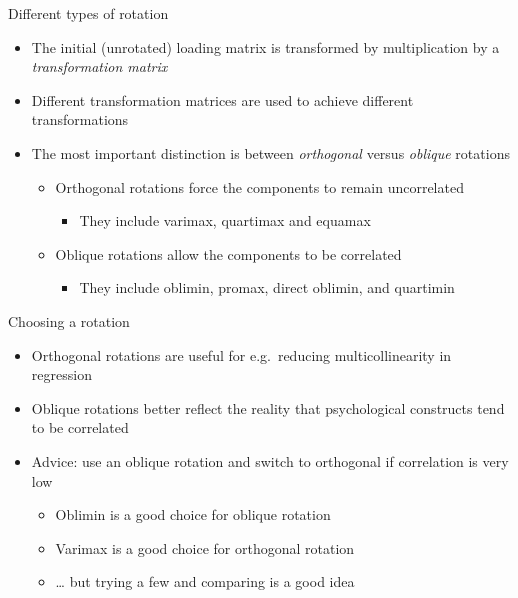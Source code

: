 \documentclass[
  ignorenonframetext,
]{beamer}
\providecommand{\tightlist}{%
  \setlength{\itemsep}{0pt}\setlength{\parskip}{0pt}}
\begin{document}
\begin{frame}{Different types of rotation}
\protect\hypertarget{different-types-of-rotation}{}

\begin{itemize}
\tightlist
\item
  The initial (unrotated) loading matrix is transformed by
  multiplication by a \emph{transformation matrix}
\item
  Different transformation matrices are used to achieve different
  transformations
\item
  The most important distinction is between \emph{orthogonal} versus
  \emph{oblique} rotations

  \begin{itemize}
  \tightlist
  \item
    Orthogonal rotations force the components to remain uncorrelated

    \begin{itemize}
    \tightlist
    \item
      They include varimax, quartimax and equamax
    \end{itemize}
  \item
    Oblique rotations allow the components to be correlated

    \begin{itemize}
    \tightlist
    \item
      They include oblimin, promax, direct oblimin, and quartimin
    \end{itemize}
  \end{itemize}
\end{itemize}

\end{frame}

\begin{frame}{Choosing a rotation}
\protect\hypertarget{choosing-a-rotation}{}

\begin{itemize}
\tightlist
\item
  Orthogonal rotations are useful for e.g.~reducing multicollinearity in
  regression
\item
  Oblique rotations better reflect the reality that psychological
  constructs tend to be correlated
\item
  Advice: use an oblique rotation and switch to orthogonal if
  correlation is very low

  \begin{itemize}
  \tightlist
  \item
    Oblimin is a good choice for oblique rotation
  \item
    Varimax is a good choice for orthogonal rotation
  \item
    \ldots{} but trying a few and comparing is a good idea
  \end{itemize}
\end{itemize}

\end{frame}
\end{document}
